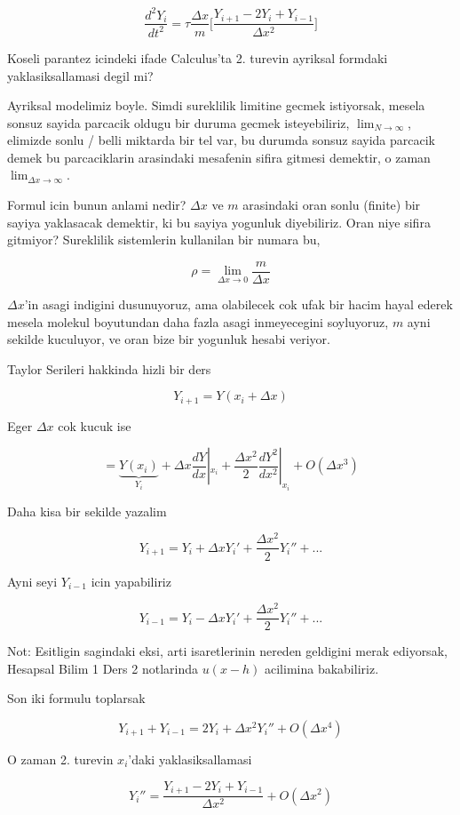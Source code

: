 \documentclass[12pt,fleqn]{article}\usepackage{../common}
\begin{document}
\[ \frac{d^2Y_i}{dt^2} = 
\tau \frac{\Delta x}{m} \bigg[
\frac{Y_{i+1} - 2Y_i + Y_{i-1}}{\Delta x^2}
\bigg]
\]

Koseli parantez icindeki ifade Calculus'ta 2. turevin ayriksal formdaki
yaklasiksallamasi degil mi?

Ayriksal modelimiz boyle. Simdi sureklilik limitine gecmek istiyorsak,
mesela sonsuz sayida parcacik oldugu bir duruma gecmek isteyebiliriz,
$\lim_{N \to \infty}$, elimizde sonlu / belli miktarda bir tel var, bu durumda 
sonsuz sayida parcacik demek bu parcaciklarin arasindaki mesafenin sifira 
gitmesi demektir, o zaman $\lim_{\Delta x \to \infty}$. 

Formul icin bunun anlami nedir? $\Delta x$ ve $m$ arasindaki oran sonlu
(finite) bir sayiya yaklasacak demektir, ki bu sayiya yogunluk
diyebiliriz. Oran niye sifira gitmiyor? Sureklilik sistemlerin kullanilan
bir numara bu,

\[ \rho = \lim_{\Delta x \to 0} \frac{m}{\Delta x} \]

$\Delta x$'in asagi indigini dusunuyoruz, ama olabilecek cok ufak bir hacim
hayal ederek mesela molekul boyutundan daha fazla asagi inmeyecegini
soyluyoruz, $m$ ayni sekilde kuculuyor, ve oran bize bir yogunluk hesabi
veriyor.

Taylor Serileri hakkinda hizli bir ders

\[ Y_{i+1}=Y(x_i + \Delta x) \]

Eger $\Delta x$ cok kucuk ise

\[ = 
\underbrace{Y(x_i)}_{Y_i} + \Delta x \frac{dY}{dx}|_{x_i} + 
\frac{\Delta x^2}{2}\frac{dY^2}{dx^2}|_{x_i} + 
O(\Delta x^3)
\]

Daha kisa bir sekilde yazalim

\[ Y_{i+1} = Y_i + \Delta x Y_i' + \frac{\Delta x^2}{2}Y_i'' + ... 
\]

Ayni seyi $Y_{i-1}$ icin yapabiliriz

\[ Y_{i-1} = Y_i - \Delta x Y_i' + \frac{\Delta x^2}{2}Y_i'' + ... 
\]

Not: Esitligin sagindaki eksi, arti isaretlerinin nereden geldigini merak
ediyorsak, Hesapsal Bilim 1 Ders 2 notlarinda $u(x-h)$ acilimina
bakabiliriz.

Son iki formulu toplarsak

\[ Y_{i+1} + Y_{i-1} = 2Y_i + \Delta x^2 Y_i''  + O(\Delta x^4)\]

O zaman 2. turevin $x_i$'daki yaklasiksallamasi 

\[ Y_i'' = \frac{Y_{i+1} - 2Y_i + Y_{i-1}}{\Delta x^2} + O(\Delta x^2) \]
\end{document}
